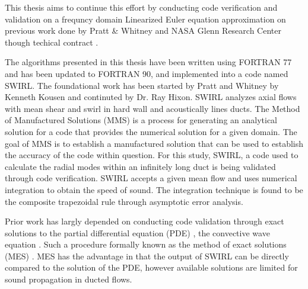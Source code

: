This thesis aims to continue this effort by conducting code verification and validation on a frequncy domain 
Linearized Euler equation approximation on previous work done by Pratt \& Whitney
and NASA Glenn Research Center though techical contract \cite{kousen1996pressure,kousen1995eigenmode}.  


The algorithms presented in this thesis have been written using FORTRAN 77 and 
has been updated to FORTRAN 90, and implemented into a code named SWIRL. The 
foundational work has been started by Pratt and Whitney by Kenneth Kousen 
\cite{kousen1996pressure} and continuted by Dr. Ray Hixon. SWIRL analyzes 
axial flows with mean shear and swirl in hard wall and acoustically lines ducts.
The Method of Manufactured Solutions (MMS) is a process for generating an 
analytical solution for a code that provides the numerical solution for a 
given domain. The goal of MMS is to establish a manufactured solution that can 
be used to establish the accuracy of the code within question. For this study, 
SWIRL, a code used to calculate the radial modes within an infinitely long duct
is being validated through code verification. SWIRL accepts a given mean flow and 
uses numerical integration to obtain the speed of sound. The integration technique
is found to be the composite trapezoidal rule through asymptotic error analysis.

Prior work has largly depended on conducting code validation through exact solutions
to the partial differential equation (PDE) , the convective wave equation . Such a
procedure formally known as the method of exact solutions (MES) \cite{MESref}. 
MES has the advantage in that the output of SWIRL can be directly compared 
to the solution of the PDE, however available solutions are limited for sound
propagation in ducted flows.


    


